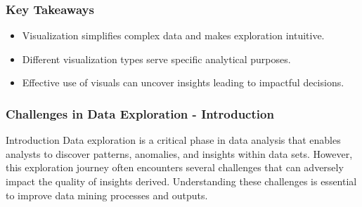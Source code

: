 \documentclass[aspectratio=169]{beamer}
\begin{document}
\begin{frame}[fragile]
    \frametitle{Key Takeaways}
    \begin{itemize}
        \item Visualization simplifies complex data and makes exploration intuitive.
        \item Different visualization types serve specific analytical purposes.
        \item Effective use of visuals can uncover insights leading to impactful decisions.
    \end{itemize}
\end{frame}

\begin{frame}[fragile]
    \frametitle{Challenges in Data Exploration - Introduction}
    \begin{block}{Introduction}
        Data exploration is a critical phase in data analysis that enables analysts to discover patterns, anomalies, and insights within data sets. However, this exploration journey often encounters several challenges that can adversely impact the quality of insights derived. Understanding these challenges is essential to improve data mining processes and outputs.
    \end{block}
\end{frame}
\end{document}
